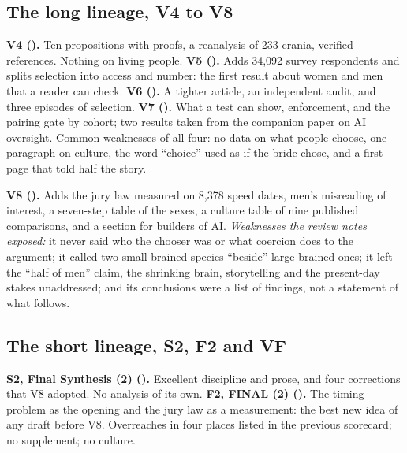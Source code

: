 \documentclass[10pt,letterpaper]{extarticle}
\newcommand{\lab}[1]{\textbf{#1}}
\begin{document}
\subsection*{The long lineage, V4 to V8}
\lab{V4 (\TotVfour).} Ten propositions with proofs, a reanalysis of 233 crania, verified references. Nothing on living
people. \lab{V5 (\TotVfive).} Adds 34{,}092 survey respondents and splits selection into access and number: the first result
about women and men that a reader can check. \lab{V6 (\TotVsix).} A tighter article, an independent audit, and three episodes of
selection. \lab{V7 (\TotVseven).} What a test can show, enforcement, and the pairing gate by cohort; two results taken from the
companion paper on AI oversight. Common weaknesses of all four: no data on what people choose, one paragraph on culture,
the word ``choice'' used as if the bride chose, and a first page that told half the story.

\lab{V8 (\TotVeight).} Adds the jury law measured on 8{,}378 speed dates, men's misreading of interest, a seven-step table of
the sexes, a culture table of nine published comparisons, and a section for builders of AI. \emph{Weaknesses the review
notes exposed:} it never said who the chooser was or what coercion does to the argument; it called two small-brained
species ``beside'' large-brained ones; it left the ``half of men'' claim, the shrinking brain, storytelling and the
present-day stakes unaddressed; and its conclusions were a list of findings, not a statement of what follows.

\subsection*{The short lineage, S2, F2 and VF}
\lab{S2, Final Synthesis (2) (\TotStwo).} Excellent discipline and prose, and four corrections that V8 adopted. No analysis of
its own. \lab{F2, FINAL (2) (\TotFtwo).} The timing problem as the opening and the jury law as a measurement: the best new
idea of any draft before V8. Overreaches in four places listed in the previous scorecard; no supplement; no culture.
\end{document}
